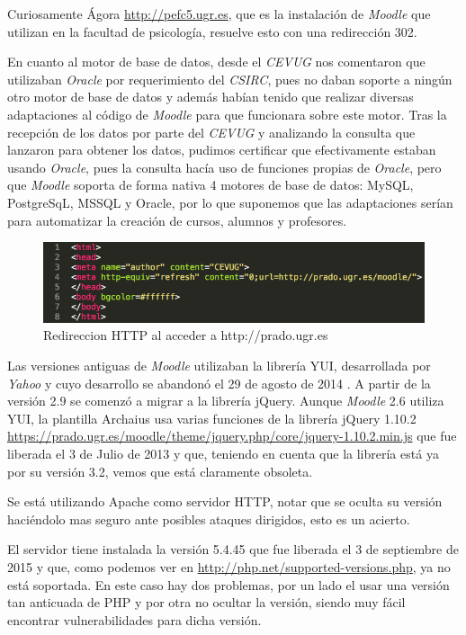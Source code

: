 \bigskip
Curiosamente Ágora \url{http://pefc5.ugr.es}, que es la instalación de \textit{Moodle} que utilizan en la facultad de psicología, resuelve esto con una redirección 302.

\bigskip
En cuanto al motor de base de datos, desde el \textit{CEVUG} nos comentaron que utilizaban \textit{Oracle} por requerimiento del \textit{CSIRC}, pues no daban soporte a ningún otro motor de base de datos y además habían tenido que realizar diversas adaptaciones al código de \textit{Moodle} para que funcionara sobre este motor. Tras la recepción de los datos por parte del \textit{CEVUG} y analizando la consulta que lanzaron para obtener los datos, pudimos certificar que efectivamente estaban usando \textit{Oracle}, pues la consulta hacía uso de funciones propias de \textit{Oracle}, pero que \textit{Moodle} soporta de forma nativa 4 motores de base de datos: MySQL, PostgreSqL, MSSQL y Oracle, por lo que suponemos que las adaptaciones serían para automatizar la creación de cursos, alumnos y profesores.

\begin{figure}
\centering
\includegraphics[width=1.0\textwidth]{../screenshots/redireccionhttp}
\caption{Redireccion HTTP al acceder a http://prado.ugr.es}
\label{redireccionhttp}
\end{figure}

\bigskip
Las versiones antiguas de \textit{Moodle} utilizaban la librería YUI, desarrollada por \textit{Yahoo} y cuyo desarrollo se abandonó el 29 de agosto de 2014 \cite{art_01}. A partir de la versión 2.9 se comenzó a migrar a la librería jQuery. Aunque \textit{Moodle} 2.6 utiliza YUI, la plantilla Archaius usa varias funciones de la librería jQuery 1.10.2 \url{https://prado.ugr.es/moodle/theme/jquery.php/core/jquery-1.10.2.min.js} que fue liberada el 3 de Julio de 2013 y que, teniendo en cuenta que la librería está ya por su versión 3.2, vemos que está claramente obsoleta.

\bigskip
Se está utilizando Apache como servidor HTTP, notar que se oculta su versión haciéndolo mas seguro ante posibles ataques dirigidos, esto es un acierto.

\bigskip
El servidor tiene instalada la versión 5.4.45 que fue liberada el 3 de septiembre de 2015 y que, como podemos ver en \url{http://php.net/supported-versions.php}, ya no está soportada. En este caso hay dos problemas, por un lado el usar una versión tan anticuada de PHP y por otra no ocultar la versión, siendo muy fácil encontrar vulnerabilidades para dicha versión.

